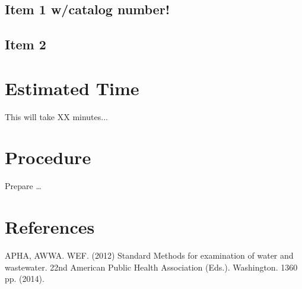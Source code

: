 \documentclass[12pt]{../SOP3_beta}
\begin{document}
\subsection{Item 1 w/catalog number!}
\subsection{Item 2}

\section{Estimated Time}

\NP This will take XX minutes...

\section{Procedure}

\NP Prepare \dots

\NP

\section{References}

\NP APHA, AWWA. WEF. (2012) Standard Methods for examination of water and wastewater. 22nd American Public Health Association (Eds.). Washington. 1360 pp. (2014).
\end{document}
